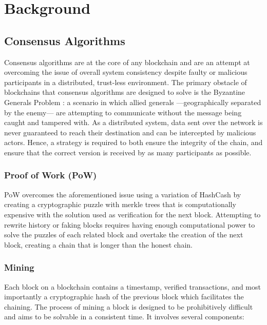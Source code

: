 \chapter{Background}

\section{Consensus Algorithms}

Consensus algorithms are at the core of any blockchain and are an attempt at overcoming the issue of overall system consistency despite faulty or malicious participants in a distributed, trust-less environment. The primary obstacle of blockchains that consensus algorithms are designed to solve is the Byzantine Generals Problem \cite{lamportshostakpease1982}: a scenario in which allied generals ---geographically separated by the enemy--- are attempting to communicate without the message being caught and tampered with. As a distributed system, data sent over the network is never guaranteed to reach their destination and can be intercepted by malicious actors. Hence, a strategy is required to both ensure the integrity of the chain, and ensure that the correct version is received by as many participants as possible.

\subsection{Proof of Work (PoW)} \label{section:pow} 

PoW overcomes the aforementioned issue using a variation of HashCash \cite{back2002} by creating a cryptographic puzzle with merkle trees that is computationally expensive with the solution used as verification for the next block. Attempting to rewrite history or faking blocks requires having enough computational power to solve the puzzles of each related block and overtake the creation of the next block, creating a chain that is longer than the honest chain.

\subsection{Mining}

Each block on a blockchain contains a timestamp, verified transactions, and most importantly a cryptographic hash of the previous block which facilitates the chaining. The process of mining a block is designed to be prohibitively difficult and aims to be solvable in a consistent time. It involves several components:

